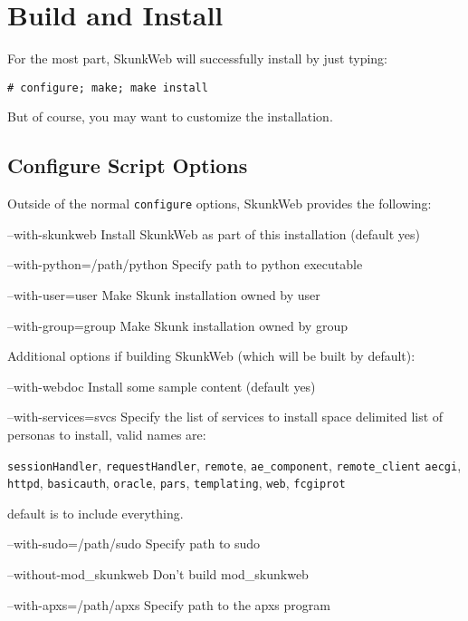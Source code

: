 \documentclass[titlepage]{manual}
\begin{document}
\chapter{Build and Install}
For the most part, SkunkWeb will successfully install by just typing:
\begin{verbatim}
# configure; make; make install
\end{verbatim}
But of course, you may want to customize the installation.

\section{Configure Script Options}
Outside of the normal \texttt{configure} options, SkunkWeb provides
the following:

\begin{argdesc}
\item[--with-skunkweb]       Install SkunkWeb as part of this installation (default yes)
\item[--with-python=/path/python]   Specify path to python executable
\item[--with-user=user]        Make Skunk installation owned by user
\item[--with-group=group]      Make Skunk installation owned by group
\end{argdesc}

Additional options if building SkunkWeb (which will be built by default):
\begin{argdesc}
\item[--with-webdoc] Install some sample content (default yes)
\item[--with-services=svcs] Specify the list of services to
install space delimited list of personas to install, valid names are:

\texttt{sessionHandler}, \texttt{requestHandler}, \texttt{remote},
\texttt{ae_component}, \texttt{remote_client}
\texttt{aecgi}, \texttt{httpd}, \texttt{basicauth}, \texttt{oracle},
\texttt{pars}, \texttt{templating}, \texttt{web}, \texttt{fcgiprot}

default is to include everything.

\item[--with-sudo=/path/sudo]  Specify path to sudo
\item[--without-mod_skunkweb]  Don't build mod_skunkweb
\item[--with-apxs=/path/apxs]  Specify path to the apxs program
\end{argdesc}
\end{document}
